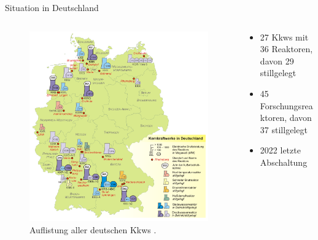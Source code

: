 \begin{frame}{ Situation in Deutschland }
  \begin{columns}

    \begin{column}{0.48\textwidth}
      \begin{figure}
        \centering
        \includegraphics[width=1\textwidth]{./bilder/Kernkraftwerke_in_Deutschland.png}
        \caption{ Auflistung aller deutschen Kkws \cite{karte_abschaltungen}. }
        \label{ fig: karte_abschaltungen }
      \end{figure}
    \end{column}

    \begin{column}{0.48\textwidth}
      \begin{itemize}
        \setlength\itemsep{1.2em}
          \item{ 27 Kkws mit 36 Reaktoren, davon 29 stillgelegt }
          \item{ 45 Forschungsreaktoren, davon 37 stillgelegt}
          \item{ 2022 letzte Abschaltung }
        \end{itemize}
    \end{column}
  \end{columns}
\end{frame}



